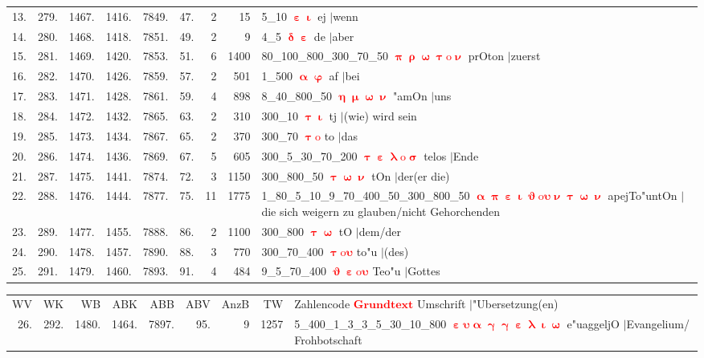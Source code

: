 \documentclass[a4paper,10pt,landscape]{article}
\begin{document}
\begin{tabular}{rrrrrrrrp{120mm}}
13.&279.&1467.&1416.&7849.&47.&2&15&5\_10 \textcolor{red}{$\boldsymbol{\upepsilon\upiota}$} ej $|$wenn\\
14.&280.&1468.&1418.&7851.&49.&2&9&4\_5 \textcolor{red}{$\boldsymbol{\updelta\upepsilon}$} de $|$aber\\
15.&281.&1469.&1420.&7853.&51.&6&1400&80\_100\_800\_300\_70\_50 \textcolor{red}{$\boldsymbol{\uppi\uprho\upomega\uptau\mathrm{o}\upnu}$} prOton $|$zuerst\\
16.&282.&1470.&1426.&7859.&57.&2&501&1\_500 \textcolor{red}{$\boldsymbol{\upalpha\upvarphi}$} af $|$bei\\
17.&283.&1471.&1428.&7861.&59.&4&898&8\_40\_800\_50 \textcolor{red}{$\boldsymbol{\upeta\upmu\upomega\upnu}$} "amOn $|$uns\\
18.&284.&1472.&1432.&7865.&63.&2&310&300\_10 \textcolor{red}{$\boldsymbol{\uptau\upiota}$} tj $|$(wie) wird sein\\
19.&285.&1473.&1434.&7867.&65.&2&370&300\_70 \textcolor{red}{$\boldsymbol{\uptau\mathrm{o}}$} to $|$das\\
20.&286.&1474.&1436.&7869.&67.&5&605&300\_5\_30\_70\_200 \textcolor{red}{$\boldsymbol{\uptau\upepsilon\uplambda\mathrm{o}\upsigma}$} telos $|$Ende\\
21.&287.&1475.&1441.&7874.&72.&3&1150&300\_800\_50 \textcolor{red}{$\boldsymbol{\uptau\upomega\upnu}$} tOn $|$der(er die)\\
22.&288.&1476.&1444.&7877.&75.&11&1775&1\_80\_5\_10\_9\_70\_400\_50\_300\_800\_50 \textcolor{red}{$\boldsymbol{\upalpha\uppi\upepsilon\upiota\upvartheta\mathrm{o}\upsilon\upnu\uptau\upomega\upnu}$} apejTo"untOn $|$die sich weigern zu glauben/nicht Gehorchenden\\
23.&289.&1477.&1455.&7888.&86.&2&1100&300\_800 \textcolor{red}{$\boldsymbol{\uptau\upomega}$} tO $|$dem/der\\
24.&290.&1478.&1457.&7890.&88.&3&770&300\_70\_400 \textcolor{red}{$\boldsymbol{\uptau\mathrm{o}\upsilon}$} to"u $|$(des)\\
25.&291.&1479.&1460.&7893.&91.&4&484&9\_5\_70\_400 \textcolor{red}{$\boldsymbol{\upvartheta\upepsilon\mathrm{o}\upsilon}$} Teo"u $|$Gottes\\
\end{tabular}
\newpage
\begin{tabular}{rrrrrrrrp{120mm}}
WV&WK&WB&ABK&ABB&ABV&AnzB&TW&Zahlencode \textcolor{red}{$\boldsymbol{Grundtext}$} Umschrift $|$"Ubersetzung(en)\\
26.&292.&1480.&1464.&7897.&95.&9&1257&5\_400\_1\_3\_3\_5\_30\_10\_800 \textcolor{red}{$\boldsymbol{\upepsilon\upsilon\upalpha\upgamma\upgamma\upepsilon\uplambda\upiota\upomega}$} e"uaggeljO $|$Evangelium/ Frohbotschaft\\
\end{tabular}\medskip \\
\end{document}
